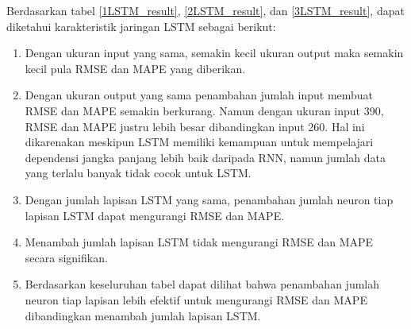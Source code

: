 \documentclass[../thesis.tex]{subfiles}
\begin{document}

Berdasarkan tabel \ref{1LSTM_result}, \ref{2LSTM_result}, dan \ref{3LSTM_result}, dapat diketahui karakteristik jaringan LSTM sebagai berikut:
\begin{enumerate}
	\item Dengan ukuran input yang sama, semakin kecil ukuran output maka semakin kecil pula RMSE dan MAPE yang diberikan. 
	\item Dengan ukuran output yang sama penambahan jumlah input membuat RMSE dan MAPE semakin berkurang. Namun dengan ukuran input 390, RMSE dan MAPE justru lebih besar dibandingkan input 260. Hal ini dikarenakan meskipun LSTM memiliki kemampuan untuk mempelajari dependensi jangka panjang lebih baik daripada RNN, namun jumlah data yang terlalu banyak tidak cocok untuk LSTM.
	\item Dengan jumlah lapisan LSTM yang sama, penambahan jumlah neuron tiap lapisan LSTM dapat mengurangi RMSE dan MAPE.
	\item Menambah jumlah lapisan LSTM tidak mengurangi RMSE dan MAPE secara signifikan.
	\item Berdasarkan keseluruhan tabel dapat dilihat bahwa penambahan jumlah neuron tiap lapisan lebih efektif untuk mengurangi RMSE dan MAPE dibandingkan menambah jumlah lapisan LSTM.
	
\end{enumerate}
\end{document}
